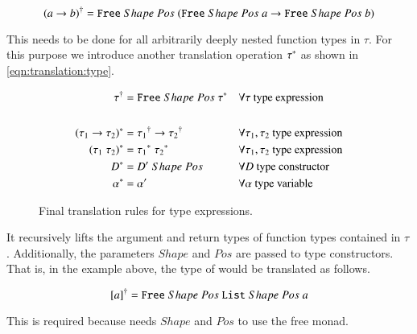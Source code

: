 \[
  {(a \rightarrow b)}^{\dagger} = {\texttt{Free}}\;Shape\;Pos\;{({\texttt{Free}}\;Shape\;Pos\;{a} \rightarrow {\texttt{Free}}\;Shape\;Pos\;{b})}
\]

This needs to be done for all arbitrarily deeply nested function types in $\tau$.
For this purpose we introduce another translation operation ${\tau}^{*}$ as shown in \autoref{eqn:translation:type}.

\begin{figure}[H]
\begin{align*}
     {\tau}^{\dagger}
  &= {\texttt{Free}}\;Shape\;Pos\;{{\tau}^{*}}
  && \forall \tau \text{ type expression}
  \\
  \\
     {(\tau_1 \rightarrow \tau_2)}^{*}
  &= {\tau_1}^{\dagger} \rightarrow {\tau_2}^{\dagger}
  && \forall \tau_1, \tau_2 \text{ type expression}
  \\
     {(\tau_1\;\tau_2)}^{*}
  &= {\tau_1}^{*}\;{\tau_2}^{*}
  && \forall \tau_1, \tau_2 \text{ type expression}
  \\
     {D}^{*}
  &= {D'}\;Shape\;Pos
  && \forall D \text{ type constructor}
  \\
  {\alpha}^{*}
  &= \alpha'
  && \forall \alpha \text{ type variable}
\end{align*}
\label{eqn:translation:type}
\caption{Final translation rules for type expressions.}
\end{figure}

It recursively lifts the argument and return types of function types contained in $\tau$.
Additionally, the parameters $Shape$ and $Pos$ are passed to type constructors.
That is, in the example above, the type of  would be translated as follows.

\[
  {[a]}^{\dagger} = {\texttt{Free}}\;Shape\;Pos\;{{\texttt{List}}\;Shape\;Pos\;a}
\]

This is required because  needs $Shape$ and $Pos$ to use the free monad.
